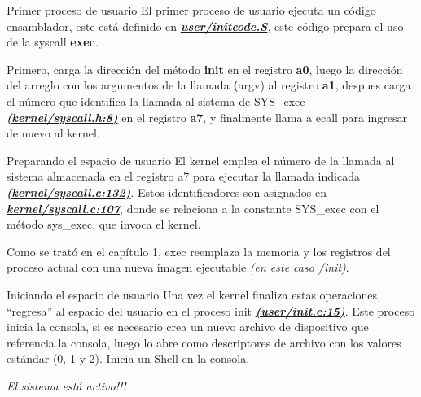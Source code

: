 \documentclass{libs/ufc_format}
\begin{document}
\begin{frame}{Primer proceso de usuario}
    El primer proceso de usuario ejecuta un código ensamblador, este está definido en \href{https://github.com/CarlosSandoval-03/xv6-riscv/blob/riscv/user/initcode.S}{\textbf{\textit{user/initcode.S}}}, este código prepara el uso de la syscall \textbf{exec}.
    
    \vspace{0.3cm}

    Primero, carga la dirección del método \textbf{init} en el registro \textbf{a0}, luego la dirección del arreglo con los argumentos de la llamada \textbf({argv)} al registro \textbf{a1}, despues carga el número que identifica la llamada al sistema de \href{https://github.com/CarlosSandoval-03/xv6-riscv/blob/riscv/kernel/syscall.h\#L8}{SYS\_exec \textbf{\textit{(kernel/syscall.h:8)}}} en el registro \textbf{a7}, y finalmente llama a ecall para ingresar de nuevo al kernel. \cite{xv6_book}
\end{frame}
\begin{frame}{Preparando el espacio de usuario}
    El kernel emplea el número de la llamada al sistema almacenada en el registro a7 para ejecutar la llamada indicada \href{https://github.com/CarlosSandoval-03/xv6-riscv/blob/riscv/kernel/syscall.c\#L132}{\textbf{\textit{(kernel/syscall.c:132)}}}. Estos identificadores son asignados en \href{https://github.com/CarlosSandoval-03/xv6-riscv/blob/riscv/kernel/syscall.c\#L107}{\textbf{\textit{kernel/syscall.c:107}}}, donde se relaciona a la constante SYS\_exec con el método sys\_exec, que invoca el kernel. \cite{xv6_book}

    \vspace{0.3cm}

    Como se trató en el capítulo 1, exec reemplaza la memoria y los registros del proceso actual con una nueva imagen ejecutable \emph{(en este caso /init)}.
\end{frame}
\begin{frame}{Iniciando el espacio de usuario}
    Una vez el kernel finaliza estas operaciones, “regresa” al espacio del usuario en el proceso init \href{https://github.com/CarlosSandoval-03/xv6-riscv/blob/riscv/user/init.c\#L15}{\textbf{\textit{(user/init.c:15)}}}. Este proceso inicia la consola, si es necesario crea un nuevo archivo de dispositivo que referencia la consola, luego lo abre como descriptores de archivo con los valores estándar (0, 1 y 2). Inicia un Shell en la consola.

    \vspace{0.2cm}

    \emph{El sistema está activo!!!}
\end{frame}
\end{document}
